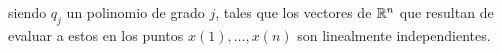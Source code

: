\begin{itemize}
siendo $q_{j}$ un polinomio de grado $j$, 
tales que los vectores de $\mathbb{R}^{n}$ que resultan de evaluar
a estos en los puntos $x(1), \ldots , x(n)$ son linealmente
independientes. 
\end{itemize}